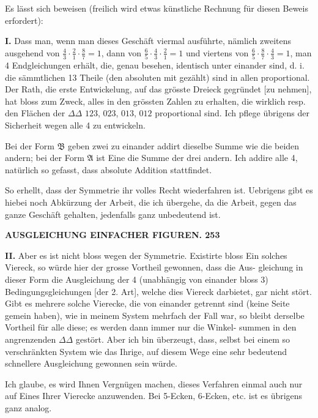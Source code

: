 \documentclass[12pt,a4paper]{article}
\theoremstyle{plain}
\theoremstyle{definition}
\theoremstyle{remark}
\begin{document}
Es l\"asst sich beweisen (freilich wird etwas k\"unstliche Rechnung f\"ur diesen
Beweis erfordert):

\textbf{I.} Dass man, wenn man dieses Gesch\"aft viermal ausf\"uhrte, n\"amlich
zweitens ausgehend von $\frac{4}{3}\cdot\frac{2}{1}\cdot\frac{8}{7} = 1$, dann von $\frac{6}{5}\cdot\frac{4}{3}\cdot\frac{2}{1} = 1$ und viertens
von $\frac{6}{5}\cdot\frac{8}{7}\cdot\frac{4}{3} = 1$, man 4 Endgleichungen erh\"alt, die, genau besehen, identisch
unter einander sind, d. i. die s\"ammtlichen 13 Theile (den absoluten mit gez\"ahlt)
sind in allen proportional. Der Rath, die erste Entwickelung, auf das
gr\"osste Dreieck gegr\"undet [zu nehmen], hat bloss zum Zweck, alles in den
gr\"ossten Zahlen zu erhalten, die wirklich resp. den Fl\"achen der $\Delta\Delta$ $123$, $023$,
$013$, $012$ proportional sind. Ich pflege \"ubrigens der Sicherheit wegen alle
4 zu entwickeln.

Bei der Form $\mathfrak{B}$ geben zwei zu einander addirt dieselbe Summe wie
die beiden andern; bei der Form $\mathfrak{A}$ ist Eine die Summe der drei andern.
Ich addire alle 4, nat\"urlich so gefasst, dass absolute Addition stattfindet.

So erhellt, dass der Symmetrie ihr volles Recht wiederfahren ist. Uebrigens
gibt es hiebei noch Abk\"urzung der Arbeit, die ich \"ubergehe, da die Arbeit,
gegen das ganze Gesch\"aft gehalten, jedenfalls ganz unbedeutend ist.


\newpage

\noindent\textbf{AUSGLEICHUNG EINFACHER FIGUREN. 253}

\textbf{II.} Aber es ist nicht bloss wegen der Symmetrie. Existirte bloss Ein
solches Viereck, so w\"urde hier der grosse Vortheil gewonnen, dass die Aus-
gleichung in dieser Form die Ausgleichung der 4 (unabh\"angig von einander
bloss 3) Bedingungsgleichungen [der 2. Art], welche dies Viereck darbietet, gar
nicht st\"ort. Gibt es mehrere solche Vierecke, die von einander getrennt sind
(keine Seite gemein haben), wie in meinem System mehrfach der Fall war, so
bleibt derselbe Vortheil f\"ur alle diese; es werden dann immer nur die Winkel-
summen in den angrenzenden $\Delta\Delta$ gest\"ort. Aber ich bin \"uberzeugt, dass,
selbst bei einem so verschr\"ankten System wie das Ihrige, auf diesem Wege
eine sehr bedeutend schnellere Ausgleichung gewonnen sein w\"urde.

Ich glaube, es wird Ihnen Vergn\"ugen machen, dieses Verfahren einmal
auch nur auf Eines Ihrer Vierecke anzuwenden. Bei 5-Ecken, 6-Ecken, etc.
ist es \"ubrigens ganz analog.
\end{document}
